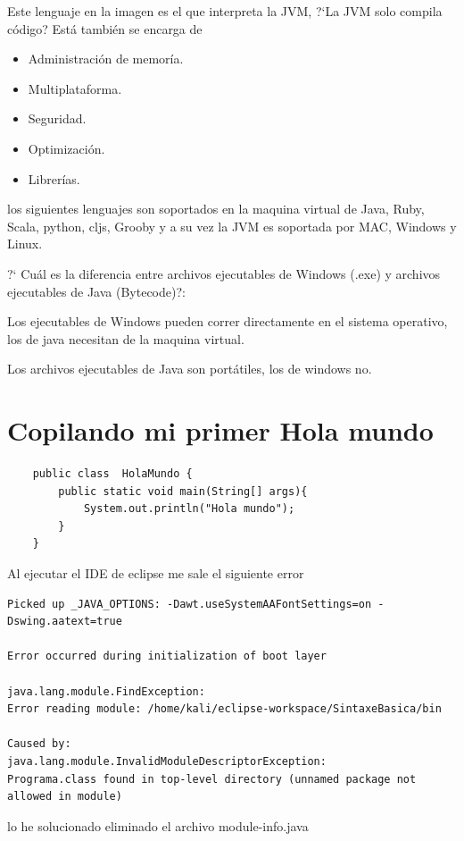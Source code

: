 Este lenguaje en la imagen es el que interpreta la JVM, ?`La JVM solo compila c\'odigo? Est\'a tambi\'en se 
encarga de 
\begin{itemize}
    \item Administraci\'on de memor\'ia. 
    \item Multiplataforma.
    \item Seguridad.
    \item Optimizaci\'on.
    \item Librer\'ias.
\end{itemize}

los siguientes lenguajes son soportados en la maquina virtual de Java, 
Ruby, Scala, python, cljs, Grooby y a su vez la JVM es soportada por MAC, Windows y Linux.

?` Cu\'al es la diferencia entre archivos ejecutables de Windows (.exe) y archivos ejecutables de Java (Bytecode)?:

Los ejecutables de Windows pueden correr directamente en el sistema operativo, los de java necesitan de la maquina virtual. 

Los archivos ejecutables de Java son port\'atiles, los de windows no.


\section{Copilando mi primer Hola mundo}

\begin{verbatim}
    public class  HolaMundo {
        public static void main(String[] args){
            System.out.println("Hola mundo");
        }
    }
\end{verbatim}


Al ejecutar el IDE de eclipse me sale el siguiente error

\begin{verbatim}
Picked up _JAVA_OPTIONS: -Dawt.useSystemAAFontSettings=on -Dswing.aatext=true

Error occurred during initialization of boot layer

java.lang.module.FindException: 
Error reading module: /home/kali/eclipse-workspace/SintaxeBasica/bin

Caused by: 
java.lang.module.InvalidModuleDescriptorException: 
Programa.class found in top-level directory (unnamed package not allowed in module)
\end{verbatim}

lo he solucionado eliminado el archivo module-info.java


